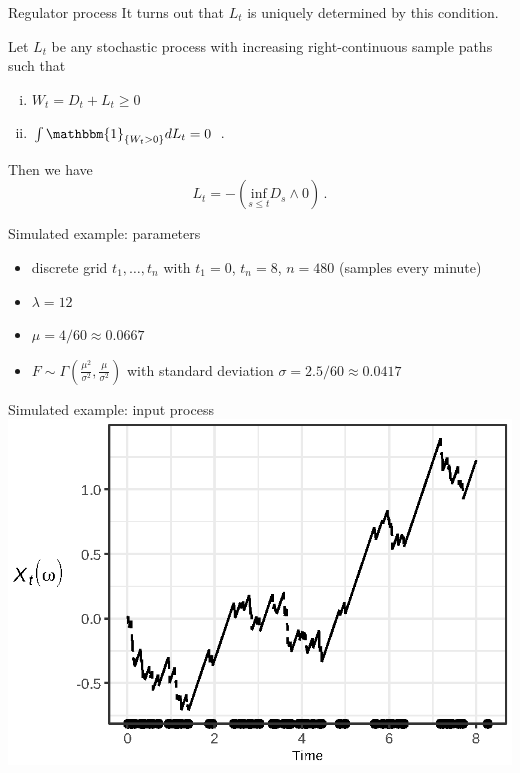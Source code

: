 \documentclass{beamer}
\begin{document}
\begin{frame}{Regulator process}
  It turns out that $L_t$ is uniquely determined by this condition.
  \begin{theorem}
    Let $L_t$ be any stochastic process with increasing right-continuous sample paths such that
    \begin{enumerate}[(i)]
      \item $W_t = D_t + L_t \geq 0$ \label{cond:regulator-i}
      \item $\int \mathbbm{1}_{\{ W_t > 0 \}} dL_t = 0$ \,. \label{cond:regulator-ii}
    \end{enumerate}
    Then we have
    \begin{equation} \label{eq:reflection}
      L_t = -(\underset{s \leq t}{\mathrm{inf}} D_s \wedge 0) \,.
    \end{equation}
  \end{theorem}
\end{frame}

\begin{frame}[plain]{Simulated example: parameters}
  \begin{itemize}
    \item discrete grid $t_1, \dots, t_n$ with $t_1 = 0$, $t_n = 8$, $n = 480$ (samples every minute)
    \item $\lambda = 12$
    \item $\mu = 4 / 60 \approx 0.0667$
    \item $F \sim \Gamma(\frac{\mu^2}{\sigma^2}, \frac{\mu}{\sigma^2})$ with standard deviation $\sigma = 2.5 / 60 \approx 0.0417$ 
  \end{itemize}
\end{frame}

\begin{frame}[plain]{Simulated example: input process}
  \includegraphics{input_prsnt}
\end{frame}
\end{document}
